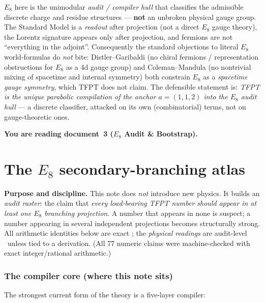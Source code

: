 \documentclass[11pt,a4paper]{article}
\theoremstyle{definition}
\begin{document}
\begin{gapbox}
$E_8$ here is the unimodular \emph{audit / compiler hull} that classifies the admissible discrete charge
and residue structures --- \textbf{not} an unbroken physical gauge group. The Standard Model is a
\emph{readout} after projection (not a direct $E_8$ gauge theory), the Lorentz signature appears only
after projection, and fermions are not ``everything in the adjoint''. Consequently the standard
objections to literal $E_8$ world-formulas do \emph{not} bite: Distler--Garibaldi (no chiral fermions /
representation obstructions for $E_8$ as a 4d gauge group) and Coleman--Mandula (no nontrivial mixing of
spacetime and internal symmetry) both constrain $E_8$ as a \emph{spacetime gauge symmetry}, which TFPT
does not claim. The defensible statement is: \emph{TFPT is the unique parabolic compilation of the anchor
$a=(1,1,2)$ into the $E_8$ audit hull} --- a discrete classifier, attacked on its own (combinatorial)
terms, not on gauge-theoretic ones.
\end{gapbox}


\noindent\textbf{You are reading \textbf{document~3} ($E_8$ Audit \& Bootstrap).}


\TFPTbadges
\TFPTclaimstack[compiler]


\tableofcontents
\clearpage
\part{The $E_8$ secondary-branching atlas}
\par\smallskip\noindent\textbf{Purpose and discipline.}
This note does \emph{not} introduce new physics. It builds an \emph{audit raster}: the claim that
\emph{every load-bearing TFPT number should appear in at least one $E_8$ branching projection}. A number
that appears in none is suspect; a number appearing in several independent projections becomes
structurally strong. All arithmetic identities below are exact \mE; the \emph{physical readings} are
audit-level \mO\ unless tied to a derivation. (All 77 numeric claims were machine-checked with exact
integer/rational arithmetic.)

\section{The compiler core (where this note sits)}
The strongest current form of the theory is a five-layer compiler:
\end{document}
